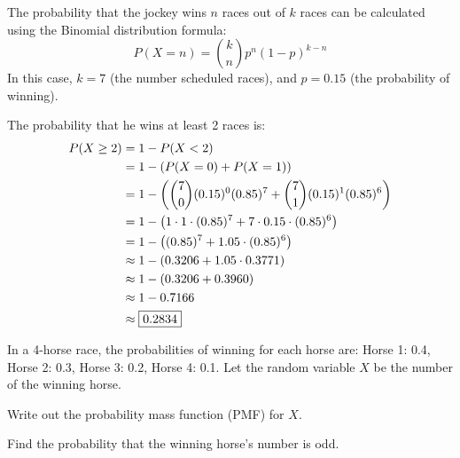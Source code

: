 \documentclass[a4paper, 10pt]{article}
\begin{document}
\begin{solution}
	The probability that the jockey wins \( n \) races out of \( k \) races
	can be calculated using the Binomial distribution formula:
	\[
		P(X = n) = \binom{k}{n} p^n (1-p)^{k-n}
	\]
	In this case, \( k = 7 \) (the number scheduled races), and \( p = 0.15 \) (the probability of winning).

	\par\noindent The probability that he wins at least 2 races is:
	\begin{align*}
		P(X \geq 2) & = 1 - P(X < 2)                                                                  \\
		            & = 1 - (P(X = 0) + P(X = 1))                                                     \\
		            & = 1 - \left( \binom{7}{0} (0.15)^0 (0.85)^7 + \binom{7}{1} (0.15)^1 (0.85)^6 \right) \\
		            & = 1 - \left( 1 \cdot 1 \cdot (0.85)^7 + 7 \cdot 0.15 \cdot (0.85)^6 \right)          \\
		            & = 1 - \left( (0.85)^7 + 1.05 \cdot (0.85)^6 \right)                                  \\
		            & \approx 1 - \left( 0.3206 + 1.05 \cdot 0.3771 \right)                                \\
		            & \approx 1 - (0.3206 + 0.3960)                                                   \\
		            & \approx 1 - 0.7166                                                              \\
		            & \approx \boxed{0.2834}
	\end{align*}
\end{solution}

\begin{problem}
In a 4-horse race, the probabilities of winning for each horse are:
Horse 1: 0.4, Horse 2: 0.3, Horse 3: 0.2, Horse 4: 0.1.
Let the random variable \( X \) be the number of the winning horse.
\begin{subproblems_alpha}
	\item Write out the probability mass function (PMF) for \( X \).
	\item Find the probability that the winning horse's number is odd.
\end{subproblems_alpha}
\end{problem}
\end{document}
